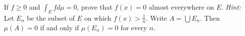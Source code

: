 \begin{exercise}
	If $f \geq 0$ and $\int_E f d\mu = 0$, prove that $f \left( x \right) = 0$ almost everywhere on $E$. \textit{Hint:} Let $E_n$ be the subset of $E$ on which $f \left( x \right) > \frac{1}{n}$. Write $A = \bigcup E_n$. Then $\mu \left( A \right) = 0$ if and only if $\mu \left( E_n \right) = 0$ for every $n$.
\end{exercise}
